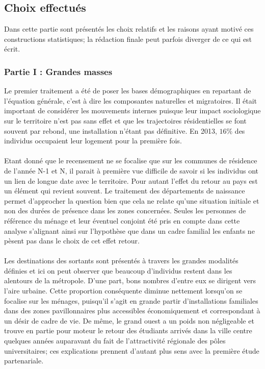 \documentclass{bredele}
\begin{document}
\subsection{Choix effectués}
Dans cette partie sont présentés les choix relatifs et les raisons ayant motivé ces constructions statistiques; la rédaction finale peut parfois diverger de ce qui est écrit.
\subsubsection{Partie I : Grandes masses}
Le premier traitement a été de poser les bases démographiques en repartant de l'équation générale, c'est à dire les composantes naturelles et migratoires. Il était important de considérer les mouvements internes puisque leur impact sociologique sur le territoire n'est pas sans effet et que les trajectoires résidentielles se font souvent par rebond, une installation n'étant pas définitive. En 2013, $16\% $ des individus occupaient leur logement pour la première fois.
\\\\Etant donné que le recensement ne se focalise que sur les communes de résidence de l’année N-1 et N, il parait à première vue difficile de savoir si les individus ont un lien de longue date avec le territoire. Pour autant l’effet du retour au pays est un élément qui revient souvent. Le traitement des départements de naissance permet d’approcher la question bien que cela ne relate qu’une situation initiale et non des durées de présence dans les zones concernées. Seules les personnes de référence du ménage et leur éventuel conjoint été pris en compte dans cette analyse s’alignant ainsi sur l’hypothèse que dans un cadre familial les enfants ne pèsent pas dans le choix de cet effet retour.
\\\\ Les destinations des sortants sont présentés à travers les grandes modalités définies et ici on peut observer que beaucoup d'individus restent dans les alentours de la métropole. D'une part, bons nombres d'entre eux se dirigent vers l'aire urbaine. Cette proportion conséquente diminue nettement lorsqu'on se focalise sur les ménages, puisqu'il s'agit en grande partir d'installations familiales dans des zones pavillonnaires plus accessibles économiquement et correspondant à un désir de cadre de vie. De même, le grand ouest a un poids non négligeable et trouve en partie pour moteur le retour des étudiants arrivés dans la ville centre quelques années auparavant du fait de l'attractivité régionale des pôles universitaires; ces explications prennent d'autant plus sens avec la première étude partenariale.
\end{document}
